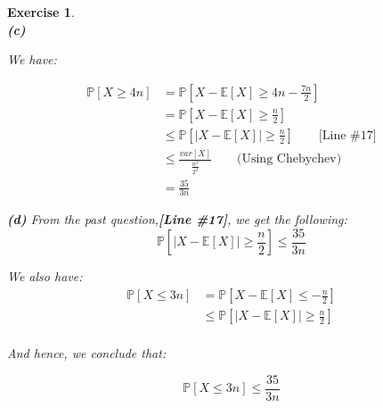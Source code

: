 \documentclass{article}
\newtheorem{exo}{Exercise}
\def\P{\mathbb{P}}
\def\E{\mathbb{E}}
\begin{document}
\begin{exo}{\ \\}
\noindent
\textbf{(c)} 

We have:

\begin{align*}
    \P[X \geq 4n]
    &= \P[X - \E[X] \geq 4n - \frac{7n}{2} ] \\
    &= \P[X - \E[X] \geq \frac{n}{2}] \\
    &\leq \P[|X-\E[X]| \geq \frac{n}{2} ] \quad \quad \text{[Line \#17]}\\
    &\leq \frac{var[X]}{\frac{n^2}{2^2}} \quad \quad \text{(Using Chebychev)} \\
    &= \frac{35}{3n} 
\end{align*}

\noindent
\textbf{(d)} 
From the past question,\textbf{[Line \#17]}, we get the following:
\[ \P[|X-\E[X]| \geq \frac{n}{2} ] \leq \frac{35}{3n}   \]

We also have:
\begin{align*}
    \P[X \leq 3n] 
    &= \P[X - \E[X] \leq -\frac{n}{2}] \\
    &\leq \P[|X-\E[X]| \geq \frac{n}{2}]  \\  
\end{align*}

And hence, we  conclude that:

\[    \P[X \leq 3n] \leq  \frac{35}{3n}    \]


\end{exo}
\end{document}
